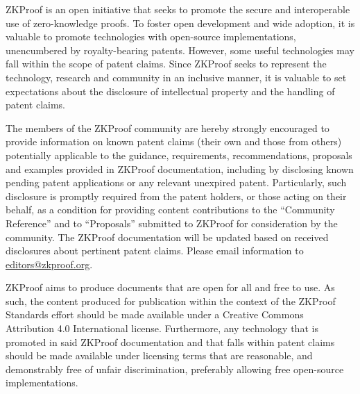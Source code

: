 \label{sec:prelim:IP}

\vspace{-1em}
	ZKProof is an open initiative that seeks to promote the secure and interoperable use of zero-knowledge proofs. 
	To foster open development and wide adoption, it is valuable to promote technologies with open-source implementations, unencumbered by royalty-bearing patents.
	However, some useful technologies may fall within the scope of patent claims. 
	Since ZKProof seeks to represent the technology, research and community in an inclusive manner, it is  
valuable to set expectations about the disclosure of intellectual property and the handling of patent claims.


	The members of the ZKProof community are hereby strongly encouraged to provide information on known patent claims 
(their own and those from others)
potentially applicable to the guidance, requirements, recommendations, proposals and examples provided in ZKProof documentation, including by disclosing known pending patent applications or any relevant unexpired patent.
	Particularly, such disclosure is promptly required from the patent holders, or those acting on their behalf, as a condition for providing content contributions to the ``Community Reference'' and to ``Proposals'' submitted to ZKProof for consideration by the community.
	The ZKProof documentation will be updated based on received disclosures about pertinent patent claims.
	Please email information to \href{mailto:editors@zkproof.org}{editors@zkproof.org}.


	ZKProof aims to produce documents that are open for all and free to use.
	As such, the content produced for publication within the context of the ZKProof Standards effort should be made available under a Creative Commons Attribution 4.0 International license.
	Furthermore, any technology that is promoted in said ZKProof documentation and that falls within patent claims should be made available under licensing terms that are reasonable, and demonstrably free of unfair discrimination, preferably allowing free open-source implementations.